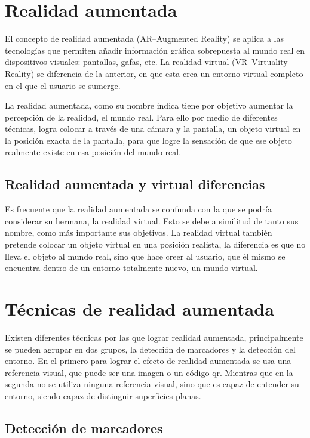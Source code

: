 

\section{Realidad aumentada}

El concepto de realidad aumentada (AR--Augmented Reality) se aplica a las tecnologías que permiten añadir información gráfica sobrepuesta al mundo real en dispositivos visuales: pantallas, gafas, etc.
La realidad virtual (VR--Virtuality Reality) se diferencia de la anterior, en que esta crea un entorno virtual completo en el que el usuario se sumerge.

La realidad aumentada, como su nombre indica tiene por objetivo aumentar la percepción de la realidad, el mundo real. Para ello por medio de diferentes técnicas, logra colocar a través de una cámara y la pantalla, un objeto virtual en la posición exacta de la pantalla, para que logre la sensación de que ese objeto realmente existe en esa posición del mundo real.

\subsection{Realidad aumentada y virtual diferencias} 
Es frecuente que la realidad aumentada se confunda con la que se podría considerar su hermana, la realidad virtual. Esto se debe a similitud de tanto sus nombre, como más importante sus objetivos. La realidad virtual también pretende colocar un objeto virtual en una posición realista, la diferencia es que no lleva el objeto al mundo real, sino que hace creer al usuario, que él mismo se encuentra dentro de un entorno totalmente nuevo, un mundo virtual.

\section{Técnicas de realidad aumentada}
Existen diferentes técnicas por las que lograr realidad aumentada, principalmente se pueden agrupar en dos grupos, la detección de marcadores y la detección del entorno. En el primero para lograr el efecto de realidad aumentada se usa una referencia visual, que puede ser una imagen o un código qr. Mientras que en la segunda no se utiliza ninguna referencia visual, sino que es capaz de entender su entorno, siendo capaz de distinguir superficies planas.

\subsection{Detección de marcadores}

